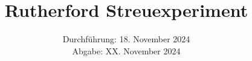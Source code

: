 

\subject{\texorpdfstring{\vspace{2ex}}{}V16\texorpdfstring{\vspace{-2ex}}{}} %
\title{Rutherford Streuexperiment} %
\date{
	Durchführung: 18. November 2024 %
	\\ Abgabe: XX. November 2024 %
}





\maketitle
\thispagestyle{empty}

\tableofcontents
\newpage








\printbibliography{}

%


